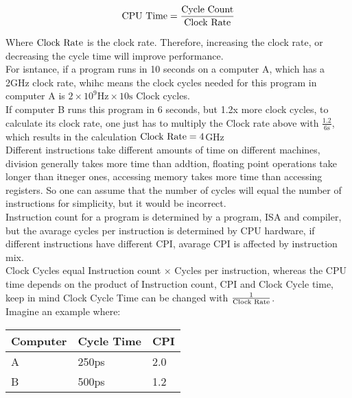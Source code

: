 \documentclass[11pt,a4paper,twocolumn]{book}
\begin{document}
\begin{equation}
\text{CPU Time} = \frac{\text{Cycle Count}}{\text{Clock Rate}}
\end{equation}

Where $\text{Clock Rate}$ is the clock rate. Therefore, increasing the clock rate, or decreasing the cycle time will improve performance.\\

For isntance, if a program runs in 10 seconds on a computer A, which has a 2GHz clock rate, whihc means the clock cycles needed for this program in computer A is $2 \times 10^9\text{Hz} \times 10\text{s} $ Clock cycles.\\

If computer B runs this program in 6 seconds, but 1.2x more clock cycles, to calculate its clock rate, one just has to multiply the Clock rate above with $\frac{1.2}{6\text{s}}$, which results in the calculation $\text{Clock Rate} = 4$GHz\\

Different instructions take different amounts of time on different machines, division generally takes more time than addtion, floating point operations take longer than itneger ones, accessing memory takes more time than accessing registers. So one can assume that the number of cycles will equal the number of instructions for simplicity, but it would be incorrect.\\

Instruction count for a program is determined by a program, ISA and compiler, but the avarage cycles per instruction is determined by CPU hardware, if different instructions have different CPI, avarage CPI is affected by instruction mix.\\

Clock Cycles equal Instruction count $\times$ Cycles per instruction, whereas the CPU time depends on the product of Instruction count, CPI and Clock Cycle time, keep in mind Clock Cycle Time can be changed with $\frac{1}{\text{Clock Rate}}$.\\

Imagine an example where:
\begin{table}[ht]
\begin{tabular}{lll}
Computer & Cycle Time & CPI\\
\toprule
A & 250ps & 2.0\\
B & 500ps & 1.2\\
\bottomrule
\end{tabular}
\end{table}
\end{document}
